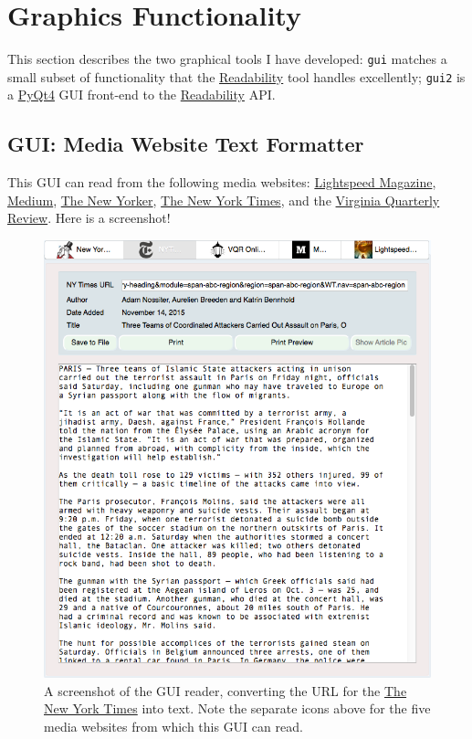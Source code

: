 \documentclass[]{article}
\begin{document}
\section{Graphics Functionality}\label{sec:graphics_functionality}
This section describes the two graphical tools I have developed:
{\verb|gui|} matches a small subset of functionality that the
\href{https://www.readability.com}{Readability} tool handles
excellently; {\verb|gui2|} is a
\href{https://www.riverbankcomputing.com/software/pyqt/download}{PyQt4}
GUI front-end to the \href{https://www.readability.com}{Readability}
API.

\subsection{GUI: Media Website Text Formatter} \label{subsec:gui}
This GUI can read from the following media websites:
\href{http://www.lightspeedmagazine.com/}{Lightspeed Magazine},
\href{https://medium.com/}{Medium},
\href{http://www.newyorker.com/}{The New Yorker},
\href{http://www.nytimes.com/?WT.z_jog=1}{The New York Times}, and the
\href{http://www.vqronline.org/}{Virginia Quarterly Review}. Here is a
screenshot!
\begin{figure}[!ht]
\begin{minipage}[!ht]{0.65\linewidth}
 \includegraphics[width=\linewidth]{images/gui_screenshot.png}
\end{minipage} \hfill
\begin{minipage}[!ht]{0.34\linewidth}
 \caption{A screenshot of the GUI reader, converting the URL for
      the \href{http://www.nytimes.com}{The New York Times} into
      text. Note the separate icons above for the five media websites
      from which this GUI can read.} \label{fig:gui_screenshot}
\end{minipage}
\end{figure}
\end{document}
